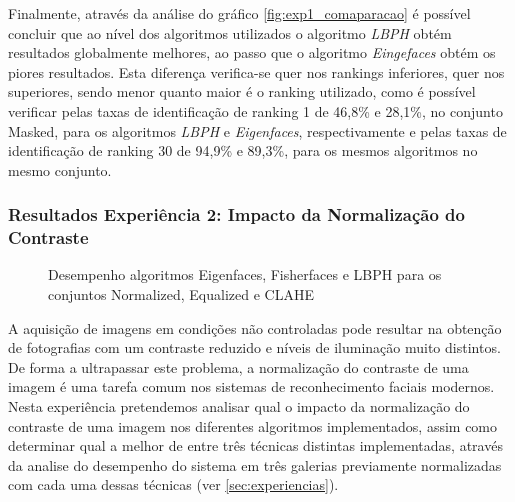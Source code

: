 Finalmente, através da análise do gráfico \ref{fig:exp1_comaparacao} é possível concluir que ao nível dos algoritmos utilizados o algoritmo \textit{LBPH} obtém resultados globalmente melhores, ao passo que o algoritmo \textit{Eingefaces} obtém os piores resultados. Esta diferença verifica-se quer nos rankings inferiores, quer nos superiores, sendo menor quanto maior é o ranking utilizado, como é possível verificar pelas taxas de identificação de ranking 1 de 46,8\% e 28,1\%, no conjunto Masked, para os algoritmos \textit{LBPH} e \textit{Eigenfaces}, respectivamente e pelas taxas de identificação de ranking 30 de 94,9\% e 89,3\%, para os mesmos algoritmos no mesmo conjunto.

\subsubsection{Resultados Experiência 2: Impacto da Normalização do Contraste}
\begin{figure}[h]

        \caption{Desempenho algoritmos Eigenfaces, Fisherfaces e LBPH para os conjuntos Normalized, Equalized e CLAHE}
        \label{fig:exp2}
\end{figure}

A aquisição de imagens em condições não controladas pode resultar na obtenção de fotografias com um contraste reduzido e níveis de iluminação muito distintos. De forma a ultrapassar este problema, a normalização do contraste de uma imagem é uma tarefa comum nos sistemas de reconhecimento faciais modernos. Nesta experiência pretendemos analisar qual o impacto da normalização do contraste de uma imagem nos diferentes algoritmos implementados, assim como determinar qual a melhor de entre três técnicas distintas implementadas, através da analise do desempenho do sistema em três galerias previamente normalizadas com cada uma dessas técnicas (ver \ref{sec:experiencias}).


